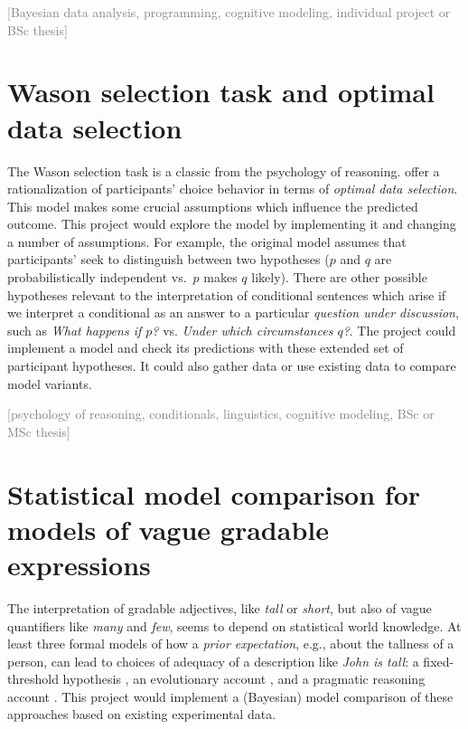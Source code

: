 \documentclass[fleqn,reqno,10pt]{article}
\newcommand{\scope}[1]{\hfill\textcolor{gray}{[#1]}}
\begin{document}
\scope{Bayesian data analysis, programming, cognitive modeling, individual project or BSc thesis}


\section{Wason selection task and optimal data selection}

The Wason selection task is a classic from the psychology of reasoning. \citet{OaksfordChater1994:A-Rational-Anal} offer a rationalization of participants' choice behavior in terms of \emph{optimal data selection}. This model makes some crucial assumptions which influence the predicted outcome. This project would explore the model by implementing it and changing a number of assumptions. For example, the original model assumes that participants' seek to distinguish between two hypotheses ($p$ and $q$ are probabilistically independent vs.~$p$ makes $q$ likely). There are other possible hypotheses relevant to the interpretation of conditional sentences which arise if we interpret a conditional as an answer to a particular \emph{question under discussion}, such as \emph{What happens if $p$?} vs. \emph{Under which circumstances $q$?}. The project could implement a model and check its predictions with these extended set of participant hypotheses. It could also gather data or use existing data to compare model variants.

\scope{psychology of reasoning, conditionals, linguistics, cognitive modeling, BSc or MSc thesis}

\section{Statistical model comparison for models of vague gradable expressions}

The interpretation of gradable adjectives, like \emph{tall} or \emph{short}, but also of vague quantifiers like \emph{many} and \emph{few}, seems to depend on statistical world knowledge. At least three formal models of how a \emph{prior expectation}, e.g., about the tallness of a person, can lead to choices of adequacy of a description like \emph{John is tall}: a fixed-threshold hypothesis \citep{FernandoKamp1996:Expecting-Many}, an evolutionary account \citep{QingFranke2014:Gradable-Adject}, and a pragmatic reasoning account \citep{LassiterGoodman2015:Adjectival-vagu}. This project would implement a (Bayesian) model comparison of these approaches based on existing experimental data.
\end{document}
